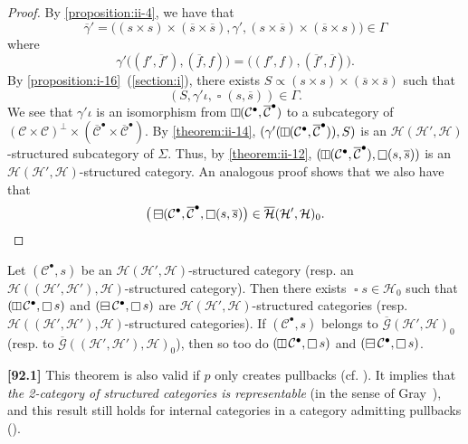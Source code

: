 \documentclass[a4paper,fleqn]{article}
\theoremstyle{plain}
\newenvironment{theorem}[1]
  {\renewcommand\theinnertheorem{#1}\innertheorem}
  {\endinnertheorem}
\theoremstyle{definition}
\newenvironment{longcomm}[1]
  {\noindent\textbf{[#1]}\rmfamily}
  {}
\newcommand{\oldpage}[1]{{\marginpar{\footnotesize$\bigg\vert$\,\,\,\,\textit{p.~#1}}}}
\newcommand{\CC}{\mathcal{C}}
\newcommand{\HH}{\mathcal{H}}
\newcommand{\subs}{\mathrel{\propto}}
\newcommand{\GG}{\mathcal{G}}
\newcommand{\hsqbox}{{\boxminus}}
\newcommand{\vsqbox}{{\rotatebox{90}{$\boxminus$}}}
\DeclareMathOperator{\sq}{\square}
\DeclareMathOperator{\hsq}{\raisebox{-.05em}{$\hsqbox$}}
\DeclareMathOperator{\vsq}{\raisebox{-.1em}{$\vsqbox$}}
\newcommand{\smallbullet}{\bullet}
\begin{document}
\begin{proof}
  By \cref{proposition:ii-4}, we have that
  \[
    \overline{\gamma}'
    = \big(
      (s\times s)\times(\overline{s}\times\overline{s}),
      \gamma',
      (s\times\overline{s})\times(\overline{s}\times s)
    \big)
    \in\Gamma
  \]
  where
  \[
    \gamma'\big((f',\overline{f}'),(\overline{f},f)\big)
    = \big((f',f),(\overline{f}',\overline{f})\big).
  \]
  By \cref{proposition:i-16}~(\cref{section:i}), there exists $S\subs(s\times s)\times(\overline{s}\times\overline{s})$ such that
  \[
    (S,\gamma'\iota,\sq(s,\overline{s}))
    \in\Gamma.
  \]
  We see that $\gamma'\iota$ is an isomorphism from $\vsq(\CC^\smallbullet,\overline{\CC}^\smallbullet)$ to a subcategory of $(\CC\times\CC)^\perp\times(\overline{\CC}^\smallbullet\times\overline{\CC}^\smallbullet)$.
  By \cref{theorem:ii-14}, $(\gamma'(\vsq(\CC^\smallbullet,\overline{\CC}^\smallbullet)),S)$ is an $\HH(\HH',\HH)$-structured subcategory of $\Sigma$.
  Thus, by \cref{theorem:ii-12}, $(\vsq(\CC^\smallbullet,\overline{\CC}^\smallbullet),\sq(s,\overline{s}))$ is an $\HH(\HH',\HH)$-structured category.
  An analogous proof shows that we also have that
  \[
    \big(\hsq(\CC^\smallbullet,\overline{\CC}^\smallbullet,\sq(s,\overline{s})\big)
    \in\overline{\HH}(\HH',\HH)_0.
    \qedhere
  \]
\end{proof}

\begin{theorem}{16}
\label{theorem:ii-16}
  \oldpage{420}
  Let $(\CC^\smallbullet,s)$ be an $\HH(\HH',\HH)$-structured category (resp. an $\HH((\HH',\HH'),\HH)$-structured category).
  Then there exists $\sq s\in\HH_0$ such that $(\vsq\CC^\smallbullet,\sq s)$ and $(\hsq\CC^\smallbullet,\sq s)$ are $\HH(\HH',\HH)$-structured categories (resp. $\HH((\HH',\HH'),\HH)$-structured categories).
  If $(\CC^\smallbullet,s)$ belongs to $\overline{\GG}(\HH',\HH)_0$ (resp. to $\overline{\GG}((\HH',\HH'),\HH)_0$), then so too do $(\vsq\CC^\smallbullet,\sq s)$ and $(\hsq\CC^\smallbullet,\sq s)$.
\end{theorem}

\begin{longcomm}{92.1}
  This theorem is also valid if $p$ only creates pullbacks (cf. \cite{coll109}).
  It implies that \emph{the 2-category of structured categories is representable} (in the sense of Gray~\cite{comm39}), and this result still holds for internal categories in a category admitting pullbacks (\cite{coll115,comm39}).
\end{longcomm}
\end{document}
